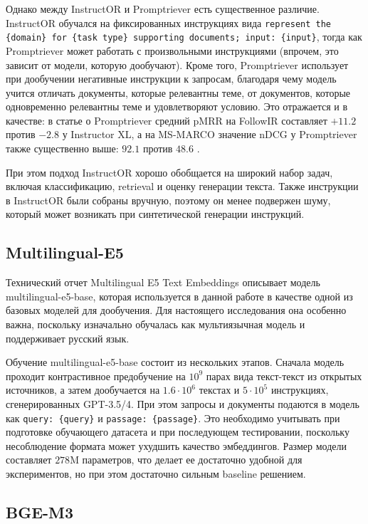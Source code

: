 \documentclass[12pt, a4paper, oneside]{article}
\begin{document}
Однако между InstructOR и Promptriever есть существенное различие. InstructOR обучался на 
фиксированных инструкциях вида \texttt{represent the \{domain\} for \{task type\} supporting documents; input: \{input\}}, 
тогда как Promptriever может работать с произвольными инструкциями 
(впрочем, это зависит от модели, которую дообучают). Кроме того, Promptriever использует при дообучении 
негативные инструкции к запросам, благодаря чему модель учится отличать документы, которые релевантны теме, от документов, которые 
одновременно релевантны теме и удовлетворяют условию. Это отражается и в качестве: в статье о Promptriever средний pMRR на FollowIR 
составляет $+11.2$ против $-2.8$ у Instructor XL, а на MS-MARCO значение nDCG у Promptriever также существенно выше: 
$92.1$ против $48.6$ \cite{weller2024promptriever}.

При этом подход InstructOR хорошо обобщается на 
широкий набор задач, включая классификацию, retrieval и оценку генерации текста. Также инструкции 
в InstructOR были собраны вручную, поэтому он менее подвержен шуму, 
который может возникать при синтетической генерации инструкций.

\subsection{Multilingual-E5}

Технический отчет Multilingual E5 Text Embeddings \cite{wang2024multilingual} 
описывает модель multilingual-e5-base, которая используется в данной работе в 
качестве одной из базовых моделей для дообучения. Для настоящего исследования 
она особенно важна, поскольку изначально обучалась как мультиязычная модель и поддерживает 
русский язык. 

Обучение multilingual-e5-base состоит из нескольких этапов. Сначала модель проходит 
контрастивное предобучение на $10^9$ парах вида текст-текст из открытых источников, 
а затем дообучается на $1.6 \cdot 10^6$ текстах и $5 \cdot 10^5$ инструкциях, 
сгенерированных GPT-3.5/4. При этом запросы и 
документы подаются в модель как \texttt{query: \{query\}} и 
\texttt{passage: \{passage\}}. Это необходимо 
учитывать при подготовке обучающего датасета и при последующем тестировании, поскольку несоблюдение формата 
может ухудшить качество эмбеддингов. Размер модели составляет $278$M параметров, что делает ее 
достаточно удобной для экспериментов, но при этом достаточно сильным baseline решением.

\subsection{BGE-M3}
\end{document}
